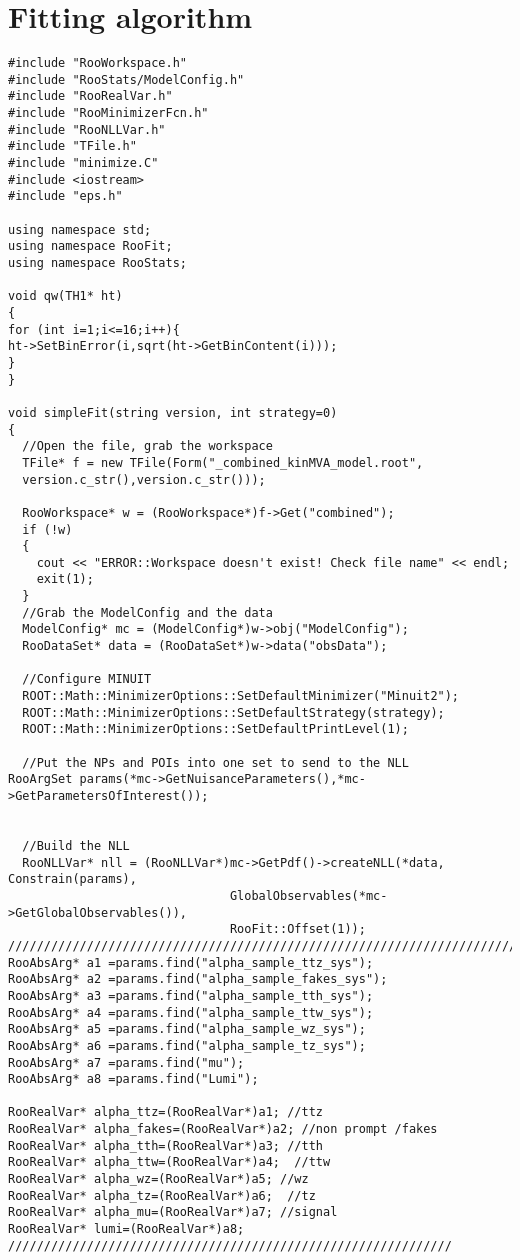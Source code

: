 
\chapter{Fitting algorithm}

\begin{verbatim}
#include "RooWorkspace.h"
#include "RooStats/ModelConfig.h"
#include "RooRealVar.h"
#include "RooMinimizerFcn.h"
#include "RooNLLVar.h"
#include "TFile.h"
#include "minimize.C"
#include <iostream>
#include "eps.h"

using namespace std;
using namespace RooFit;
using namespace RooStats;

void qw(TH1* ht)
{
for (int i=1;i<=16;i++){
ht->SetBinError(i,sqrt(ht->GetBinContent(i)));
}
}

void simpleFit(string version, int strategy=0)
{
  //Open the file, grab the workspace
  TFile* f = new TFile(Form("_combined_kinMVA_model.root",
  version.c_str(),version.c_str()));

  RooWorkspace* w = (RooWorkspace*)f->Get("combined");
  if (!w)
  {
    cout << "ERROR::Workspace doesn't exist! Check file name" << endl;
    exit(1);
  }
  //Grab the ModelConfig and the data
  ModelConfig* mc = (ModelConfig*)w->obj("ModelConfig");
  RooDataSet* data = (RooDataSet*)w->data("obsData");

  //Configure MINUIT
  ROOT::Math::MinimizerOptions::SetDefaultMinimizer("Minuit2");
  ROOT::Math::MinimizerOptions::SetDefaultStrategy(strategy);
  ROOT::Math::MinimizerOptions::SetDefaultPrintLevel(1);

  //Put the NPs and POIs into one set to send to the NLL
RooArgSet params(*mc->GetNuisanceParameters(),*mc->GetParametersOfInterest());


  //Build the NLL
  RooNLLVar* nll = (RooNLLVar*)mc->GetPdf()->createNLL(*data, Constrain(params),
						       GlobalObservables(*mc->GetGlobalObservables()),
						       RooFit::Offset(1));
////////////////////////////////////////////////////////////////////////////////
RooAbsArg* a1 =params.find("alpha_sample_ttz_sys");
RooAbsArg* a2 =params.find("alpha_sample_fakes_sys");
RooAbsArg* a3 =params.find("alpha_sample_tth_sys");
RooAbsArg* a4 =params.find("alpha_sample_ttw_sys");
RooAbsArg* a5 =params.find("alpha_sample_wz_sys");
RooAbsArg* a6 =params.find("alpha_sample_tz_sys");
RooAbsArg* a7 =params.find("mu");
RooAbsArg* a8 =params.find("Lumi");

RooRealVar* alpha_ttz=(RooRealVar*)a1; //ttz
RooRealVar* alpha_fakes=(RooRealVar*)a2; //non prompt /fakes
RooRealVar* alpha_tth=(RooRealVar*)a3; //tth
RooRealVar* alpha_ttw=(RooRealVar*)a4;  //ttw
RooRealVar* alpha_wz=(RooRealVar*)a5; //wz
RooRealVar* alpha_tz=(RooRealVar*)a6;  //tz
RooRealVar* alpha_mu=(RooRealVar*)a7; //signal
RooRealVar* lumi=(RooRealVar*)a8;
//////////////////////////////////////////////////////////////


\end{verbatim}
